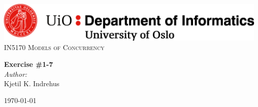 \begin{titlepage}
    \vbox{ }
    \vbox{ }
    \begin{center}
        \includegraphics[width=1\textwidth]{./images/ifi.png}\\[1cm]
        \textsc{\Large IN5170 Models of Concurrency}\\[0.5cm]
        \vbox{ }
        
        { \huge \bfseries Exercise \#1-7}\\[0.4cm]
        
        \large
        \emph{Author:}\\
            Kjetil K. Indrehus
        \vfill
        
        {\large\today}
    \end{center}
\end{titlepage}